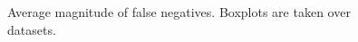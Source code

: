 \documentclass[11pt]{article}
\begin{document}
\begin{figure}[H]
	\centering
	\caption{Average magnitude of false negatives. Boxplots are taken over datasets.}
	\label{fig:exp3-mag-fn}
\end{figure}
\end{document}
